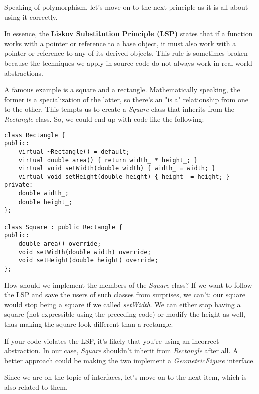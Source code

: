 Speaking of polymorphism, let's move on to the next principle as it is all about using it correctly.



In essence, the \textbf{Liskov Substitution Principle (LSP)} states that if a function works with a pointer or reference to a base object, it must also work with a pointer or reference to any of its derived objects. This rule is sometimes broken because the techniques we apply in source code do not always work in real-world abstractions.

A famous example is a square and a rectangle. Mathematically speaking, the former is a specialization of the latter, so there's an "is a" relationship from one to the other. This tempts us to create a \textit{Square} class that inherits from the \textit{Rectangle} class. So, we could end up with code like the following:

\begin{lstlisting}[style=styleCXX]
class Rectangle {
public:
	virtual ~Rectangle() = default;
	virtual double area() { return width_ * height_; }
	virtual void setWidth(double width) { width_ = width; }
	virtual void setHeight(double height) { height_ = height; }
private:
	double width_;
	double height_;
};

class Square : public Rectangle {
public:
	double area() override;
	void setWidth(double width) override;
	void setHeight(double height) override;
};

\end{lstlisting}

How should we implement the members of the \textit{Square} class? If we want to follow the LSP and save the users of such classes from surprises, we can't: our square would stop being a square if we called \textit{setWidth}. We can either stop having a square (not expressible using the preceding code) or modify the height as well, thus making the square look different than a rectangle.

If your code violates the LSP, it's likely that you're using an incorrect abstraction. In our case, \textit{Square} shouldn't inherit from \textit{Rectangle} after all. A better approach could be making the two implement a \textit{GeometricFigure} interface.

Since we are on the topic of interfaces, let's move on to the next item, which is also related to them.



